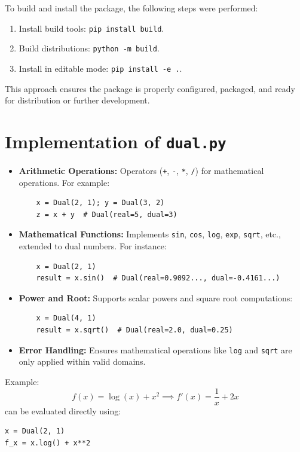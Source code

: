 \documentclass[a4paper,12pt]{article}
\begin{document}
To build and install the package, the following steps were performed:
\begin{enumerate}
    \item Install build tools: \texttt{pip install build}.
    \item Build distributions: \texttt{python -m build}.
    \item Install in editable mode: \texttt{pip install -e .}.
\end{enumerate}

This approach ensures the package is properly configured, packaged, and ready for distribution or further development.

\section{Implementation of \texttt{dual.py}}

\begin{itemize}
    \item \textbf{Arithmetic Operations:} Operators (\texttt{+}, \texttt{-}, \texttt{*}, \texttt{/}) for mathematical operations. For example:
    \begin{verbatim}
    x = Dual(2, 1); y = Dual(3, 2)
    z = x + y  # Dual(real=5, dual=3)
    \end{verbatim}
    \item \textbf{Mathematical Functions:} Implements \texttt{sin}, \texttt{cos}, \texttt{log}, \texttt{exp}, \texttt{sqrt}, etc., extended to dual numbers. For instance:
    \begin{verbatim}
    x = Dual(2, 1)
    result = x.sin()  # Dual(real=0.9092..., dual=-0.4161...)
    \end{verbatim}
    \item \textbf{Power and Root:} Supports scalar powers and square root computations:
    \begin{verbatim}
    x = Dual(4, 1)
    result = x.sqrt()  # Dual(real=2.0, dual=0.25)
    \end{verbatim}
    \item \textbf{Error Handling:} Ensures mathematical operations like \texttt{log} and \texttt{sqrt} are only applied within valid domains.
\end{itemize}

Example:
\[
f(x) = \log(x) + x^2 \implies f'(x) = \frac{1}{x} + 2x
\]
can be evaluated directly using:
\begin{verbatim}
x = Dual(2, 1)
f_x = x.log() + x**2  
\end{verbatim}
\end{document}
